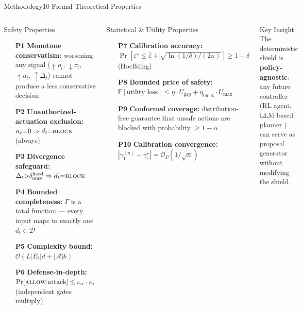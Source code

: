 \documentclass[aspectratio=169,10pt]{beamer}
\newcommand{\tightlist}{\setlength{\itemsep}{2pt}\setlength{\parskip}{0pt}\setlength{\topsep}{0pt}}
\begin{document}
\begin{frame}[t,shrink=12]{Methodology}{10 Formal Theoretical Properties}
  \begin{columns}[t]
    \begin{block}{Safety Properties}
      \footnotesize
      \begin{enumerate}\tightlist
        \item[\textbf{P1}] \textbf{Monotone conservatism:} worsening any signal ($\uparrow\rho_t$, $\downarrow\tau_t$, $\uparrow u_t$, $\uparrow\Delta_t$) cannot produce a less conservative decision \cite{alshiekh2018shielding}
        \item[\textbf{P2}] \textbf{Unauthorized-actuation exclusion:} $\alpha_t{=}0 \Rightarrow d_t{=}\textsc{block}$ (always)
        \item[\textbf{P3}] \textbf{Divergence safeguard:} $\Delta_t{>}\delta^\text{hard}_\text{max} \Rightarrow d_t{=}\textsc{block}$
        \item[\textbf{P4}] \textbf{Bounded completeness:} $\Gamma$ is a total function — every input maps to exactly one $d_t \in \mathcal{D}$
        \item[\textbf{P5}] \textbf{Complexity bound:} $\mathcal{O}(L|E_t|d + |\mathcal{A}|k)$
        \item[\textbf{P6}] \textbf{Defense-in-depth:} $\Pr[\textsc{allow}|\text{attack}] \le \varepsilon_\alpha \cdot \varepsilon_\tau$ (independent gates multiply)
      \end{enumerate}
    \end{block}
    \begin{block}{Statistical \& Utility Properties}
      \footnotesize
      \begin{enumerate}\tightlist
        \item[\textbf{P7}] \textbf{Calibration accuracy:} $\Pr[\varepsilon^\star \le \hat\varepsilon + \sqrt{\ln(1/\delta)/(2n)}] \ge 1-\delta$ (Hoeffding) \cite{angelopoulos2023conformal}
        \item[\textbf{P8}] \textbf{Bounded price of safety:} $\mathbb{E}[\text{utility loss}] \le \eta \cdot U_\text{gap} + \eta_\text{block} \cdot U_\text{max}$
        \item[\textbf{P9}] \textbf{Conformal coverage:} distribution-free guarantee that unsafe actions are blocked with probability ${\ge}1{-}\alpha$ \cite{angelopoulos2023conformal}
        \item[\textbf{P10}] \textbf{Calibration convergence:} $|\gamma_1^{(n)} - \gamma_1^\star| = \mathcal{O}_P(1/\sqrt{n})$
      \end{enumerate}
    \end{block}
    \vspace{0.15cm}
    \begin{alertblock}{Key Insight}
      \footnotesize The deterministic shield is \textbf{policy-agnostic}: any future controller (RL agent, LLM-based planner \cite{toward_autonomous_oran_2026}) can serve as proposal generator without modifying the shield.
    \end{alertblock}
  \end{columns}
\end{frame}
\end{document}
